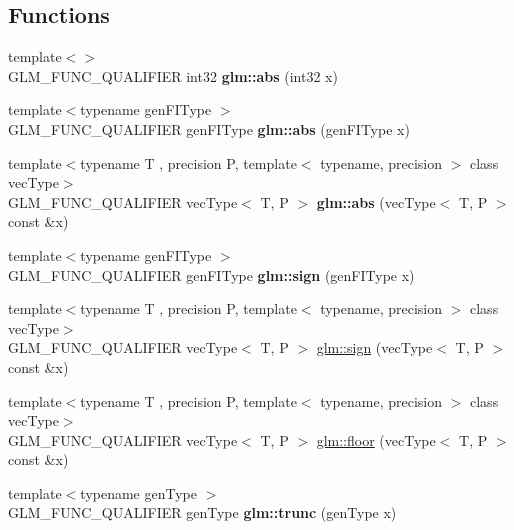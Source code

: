 \subsection*{Functions}
\begin{DoxyCompactItemize}
\item 
\hypertarget{namespaceglm_a297722642f818493a6e4b02f4cf7781b}{{\footnotesize template$<$$>$ }\\G\-L\-M\-\_\-\-F\-U\-N\-C\-\_\-\-Q\-U\-A\-L\-I\-F\-I\-E\-R int32 {\bfseries glm\-::abs} (int32 x)}\label{namespaceglm_a297722642f818493a6e4b02f4cf7781b}

\item 
\hypertarget{namespaceglm_a20ebe8867152652a4830a35894b5ab33}{{\footnotesize template$<$typename gen\-F\-I\-Type $>$ }\\G\-L\-M\-\_\-\-F\-U\-N\-C\-\_\-\-Q\-U\-A\-L\-I\-F\-I\-E\-R gen\-F\-I\-Type {\bfseries glm\-::abs} (gen\-F\-I\-Type x)}\label{namespaceglm_a20ebe8867152652a4830a35894b5ab33}

\item 
\hypertarget{group__core__func__common_ga4e8c1187dff84385308245090d440b35}{{\footnotesize template$<$typename T , precision P, template$<$ typename, precision $>$ class vec\-Type$>$ }\\G\-L\-M\-\_\-\-F\-U\-N\-C\-\_\-\-Q\-U\-A\-L\-I\-F\-I\-E\-R vec\-Type$<$ T, P $>$ {\bfseries glm\-::abs} (vec\-Type$<$ T, P $>$ const \&x)}\label{group__core__func__common_ga4e8c1187dff84385308245090d440b35}

\item 
\hypertarget{namespaceglm_a4cb99d6c397185120f49d1d56cf45b84}{{\footnotesize template$<$typename gen\-F\-I\-Type $>$ }\\G\-L\-M\-\_\-\-F\-U\-N\-C\-\_\-\-Q\-U\-A\-L\-I\-F\-I\-E\-R gen\-F\-I\-Type {\bfseries glm\-::sign} (gen\-F\-I\-Type x)}\label{namespaceglm_a4cb99d6c397185120f49d1d56cf45b84}

\item 
{\footnotesize template$<$typename T , precision P, template$<$ typename, precision $>$ class vec\-Type$>$ }\\G\-L\-M\-\_\-\-F\-U\-N\-C\-\_\-\-Q\-U\-A\-L\-I\-F\-I\-E\-R vec\-Type$<$ T, P $>$ \hyperlink{group__core__func__common_gac3446b4138e0b8757561c07cd19f084d}{glm\-::sign} (vec\-Type$<$ T, P $>$ const \&x)
\item 
{\footnotesize template$<$typename T , precision P, template$<$ typename, precision $>$ class vec\-Type$>$ }\\G\-L\-M\-\_\-\-F\-U\-N\-C\-\_\-\-Q\-U\-A\-L\-I\-F\-I\-E\-R vec\-Type$<$ T, P $>$ \hyperlink{group__core__func__common_ga568b822b78f045f77c3325e165b44d5d}{glm\-::floor} (vec\-Type$<$ T, P $>$ const \&x)
\item 
\hypertarget{namespaceglm_a1bd4a73a4a1f73950597df2f67c01c43}{{\footnotesize template$<$typename gen\-Type $>$ }\\G\-L\-M\-\_\-\-F\-U\-N\-C\-\_\-\-Q\-U\-A\-L\-I\-F\-I\-E\-R gen\-Type {\bfseries glm\-::trunc} (gen\-Type x)}\label{namespaceglm_a1bd4a73a4a1f73950597df2f67c01c43}


\end{DoxyCompactItemize}
